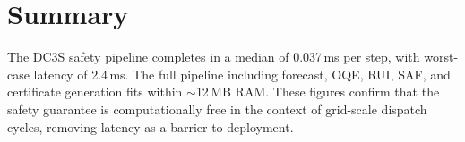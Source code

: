 \section{Summary}

The DC3S safety pipeline completes in a median of 0.037\,ms per step,
with worst-case latency of 2.4\,ms.  The full pipeline including
forecast, OQE, RUI, SAF, and certificate generation fits within
$\sim$12\,MB RAM.  These figures confirm that the safety guarantee
is computationally free in the context of grid-scale dispatch cycles,
removing latency as a barrier to deployment.
